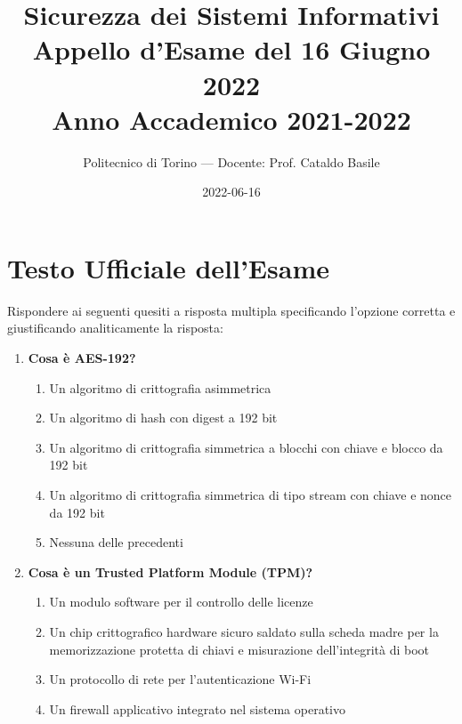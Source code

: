 \documentclass[11pt,a4paper]{article}
\begin{document}
\title{\textbf{Sicurezza dei Sistemi Informativi} \\ \large Appello d'Esame del 16 Giugno 2022 \\ \small Anno Accademico 2021-2022}
\author{Politecnico di Torino --- Docente: Prof. Cataldo Basile}
\date{2022-06-16}
\maketitle


\section{Testo Ufficiale dell'Esame}

\begin{questionbox}
Rispondere ai seguenti quesiti a risposta multipla specificando l'opzione corretta e giustificando analiticamente la risposta:
\begin{enumerate}[label=\textbf{1.\arabic*}]
    \item \textbf{Cosa \`e AES-192?}
    \begin{enumerate}[label=\alph*.]
        \item Un algoritmo di crittografia asimmetrica
        \item Un algoritmo di hash con digest a 192 bit
        \item Un algoritmo di crittografia simmetrica a blocchi con chiave e blocco da 192 bit
        \item Un algoritmo di crittografia simmetrica di tipo stream con chiave e nonce da 192 bit
        \item Nessuna delle precedenti
    \end{enumerate}
    
    \item \textbf{Cosa \`e un Trusted Platform Module (TPM)?}
    \begin{enumerate}[label=\alph*.]
        \item Un modulo software per il controllo delle licenze
        \item Un chip crittografico hardware sicuro saldato sulla scheda madre per la memorizzazione protetta di chiavi e misurazione dell'integrit\`a di boot
        \item Un protocollo di rete per l'autenticazione Wi-Fi
        \item Un firewall applicativo integrato nel sistema operativo
    \end{enumerate}
\end{enumerate}
\end{questionbox}
\end{document}
